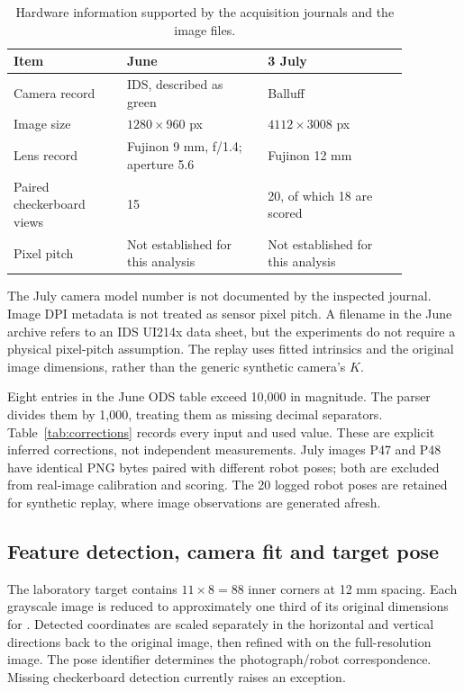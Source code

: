 \documentclass[12pt,a4paper]{article}
\newcommand{\code}[1]{\texttt{\detokenize{#1}}}
\begin{document}
\begin{table}[!htbp]\centering\small
\caption{Hardware information supported by the acquisition journals and the image files.}\label{tab:hardware}
\begin{tabular}{p{0.25\linewidth}p{0.31\linewidth}p{0.31\linewidth}}\toprule
Item & June & 3 July\\\midrule
Camera record & IDS, described as green & Balluff\\
Image size & $1280\times960$ px & $4112\times3008$ px\\
Lens record & Fujinon 9 mm, f/1.4; aperture 5.6 & Fujinon 12 mm\\
Paired checkerboard views & 15 & 20, of which 18 are scored\\
Pixel pitch & Not established for this analysis & Not established for this analysis\\\bottomrule
\end{tabular}
\end{table}
The July camera model number is not documented by the inspected journal. Image DPI metadata is not treated as sensor pixel pitch. A filename in the June archive refers to an IDS UI214x data sheet, but the experiments do not require a physical pixel-pitch assumption. The replay uses fitted intrinsics and the original image dimensions, rather than the generic synthetic camera's $K$. \cite{laboratoryarchive,experimentcode}

Eight entries in the June ODS table exceed 10,000 in magnitude. The parser divides them by 1,000, treating them as missing decimal separators. Table~\ref{tab:corrections} records every input and used value. These are explicit inferred corrections, not independent measurements. July images P47 and P48 have identical PNG bytes paired with different robot poses; both are excluded from real-image calibration and scoring. The 20 logged robot poses are retained for synthetic replay, where image observations are generated afresh. \cite{laboratoryarchive,experimentcode}

\subsection{Feature detection, camera fit and target pose}
The laboratory target contains $11\times8=88$ inner corners at 12 mm spacing. Each grayscale image is reduced to approximately one third of its original dimensions for \code{findChessboardCorners}. Detected coordinates are scaled separately in the horizontal and vertical directions back to the original image, then refined with \code{cornerSubPix} on the full-resolution image. The pose identifier determines the photograph/robot correspondence. Missing checkerboard detection currently raises an exception. \cite{experimentcode,opencv}
\end{document}
